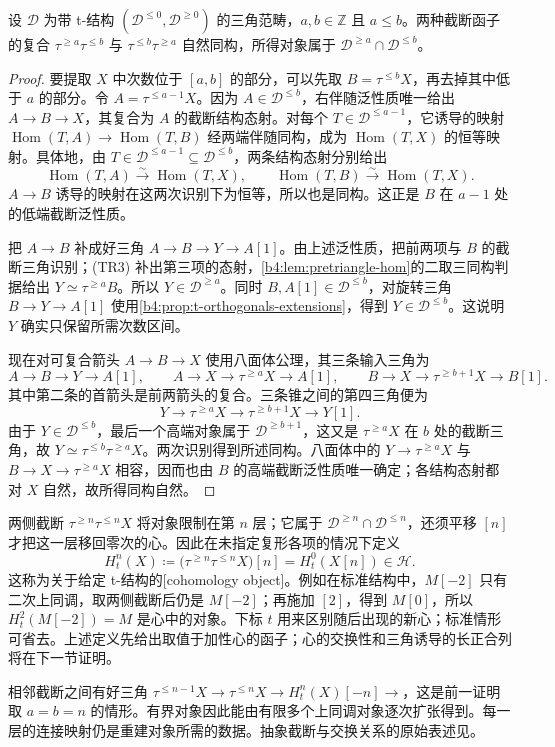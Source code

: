\begin{proposition}\label{b4:prop:t-truncation-commute}
	设 \(\mathcal D\) 为带 t-结构 \((\mathcal D^{\le0},\mathcal D^{\ge0})\) 的三角范畴，\(a,b\in\mathbb Z\) 且 \(a\le b\)。两种截断函子的复合 \(\tau^{\ge a}\tau^{\le b}\) 与 \(\tau^{\le b}\tau^{\ge a}\) 自然同构，所得对象属于 \(\mathcal D^{\ge a}\cap\mathcal D^{\le b}\)。
\end{proposition}
\begin{proof}
	要提取 \(X\) 中次数位于 \([a,b]\) 的部分，可以先取 \(B=\tau^{\le b}X\)，再去掉其中低于 \(a\) 的部分。令 \(A=\tau^{\le a-1}X\)。因为 \(A\in\mathcal D^{\le b}\)，右伴随泛性质唯一给出 \(A\to B\to X\)，其复合为 \(A\) 的截断结构态射。对每个 \(T\in\mathcal D^{\le a-1}\)，它诱导的映射 \(\operatorname{Hom}(T,A)\to\operatorname{Hom}(T,B)\) 经两端伴随同构，成为 \(\operatorname{Hom}(T,X)\) 的恒等映射。具体地，由 \(T\in\mathcal D^{\le a-1}\subseteq\mathcal D^{\le b}\)，两条结构态射分别给出
	\[
		\operatorname{Hom}(T,A)\xrightarrow{\sim}\operatorname{Hom}(T,X), \qquad\operatorname{Hom}(T,B)\xrightarrow{\sim}\operatorname{Hom}(T,X).
	\]
	\(A\to B\) 诱导的映射在这两次识别下为恒等，所以也是同构。这正是 \(B\) 在 \(a-1\) 处的低端截断泛性质。

	把 \(A\to B\) 补成好三角 \(A\to B\to Y\to A[1]\)。由上述泛性质，把前两项与 \(B\) 的截断三角识别；(TR3) 补出第三项的态射，\cref{b4:lem:pretriangle-hom}的二取三同构判据给出 \(Y\simeq\tau^{\ge a}B\)。所以 \(Y\in\mathcal D^{\ge a}\)。同时 \(B,A[1]\in\mathcal D^{\le b}\)，对旋转三角 \(B\to Y\to A[1]\) 使用\cref{b4:prop:t-orthogonals-extensions}，得到 \(Y\in\mathcal D^{\le b}\)。这说明 \(Y\) 确实只保留所需次数区间。

	现在对可复合箭头 \(A\to B\to X\) 使用八面体公理，其三条输入三角为
	\[
		A\to B\to Y\to A[1],\qquad A\to X\to\tau^{\ge a}X\to A[1],\qquad B\to X\to\tau^{\ge b+1}X\to B[1].
	\]
	其中第二条的首箭头是前两箭头的复合。三条锥之间的第四三角便为
	\[
		Y\longrightarrow\tau^{\ge a}X\longrightarrow\tau^{\ge b+1}X\longrightarrow Y[1].
	\]
	由于 \(Y\in\mathcal D^{\le b}\)，最后一个高端对象属于 \(\mathcal D^{\ge b+1}\)，这又是 \(\tau^{\ge a}X\) 在 \(b\) 处的截断三角，故 \(Y\simeq\tau^{\le b}\tau^{\ge a}X\)。两次识别得到所述同构。八面体中的 \(Y\to\tau^{\ge a}X\) 与 \(B\to X\to\tau^{\ge a}X\) 相容，因而也由 \(B\) 的高端截断泛性质唯一确定；各结构态射都对 \(X\) 自然，故所得同构自然。
\end{proof}

两侧截断 \(\tau^{\ge n}\tau^{\le n}X\) 将对象限制在第 \(n\) 层；它属于 \(\mathcal D^{\ge n}\cap\mathcal D^{\le n}\)，还须平移 \([n]\) 才把这一层移回零次的心。因此在未指定复形各项的情况下定义
\[
	H_t^n(X)\coloneqq\bigl(\tau^{\ge n}\tau^{\le n}X\bigr)[n] =H_t^0(X[n])\in\mathcal H.
\]
这称为关于给定 t-结构的[cohomology object]。例如在标准结构中，\(M[-2]\) 只有二次上同调，取两侧截断后仍是 \(M[-2]\)；再施加 \([2]\)，得到 \(M[0]\)，所以 \(H_t^2(M[-2])=M\) 是心中的对象。下标 \(t\) 用来区别随后出现的新心；标准情形可省去。上述定义先给出取值于加性心的函子；心的交换性和三角诱导的长正合列将在下一节证明。

\ProseParagraphBreak
相邻截断之间有好三角 \(\tau^{\le n-1}X\to\tau^{\le n}X\to H_t^n(X)[-n]\to\)，这是前一证明取 \(a=b=n\) 的情形。有界对象因此能由有限多个上同调对象逐次扩张得到。每一层的连接映射仍是重建对象所需的数据。抽象截断与交换关系的原始表述见\cite[Propositions 1.3.3, 1.3.5]{BBD1982FaisceauxPervers}。
